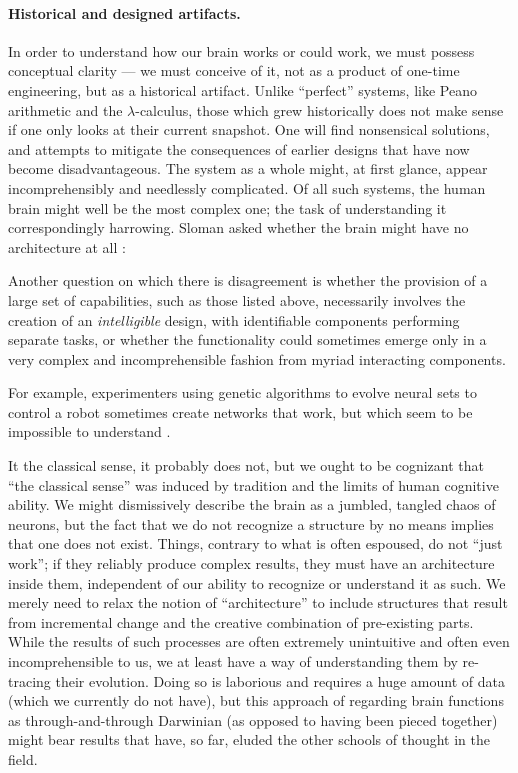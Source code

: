 \paragraph{Historical and designed artifacts.} In order to understand how our brain works or could work, we must possess conceptual clarity --- we must conceive of it, not as a product of one-time engineering, but as a historical artifact. Unlike ``perfect'' systems, like Peano arithmetic and the $\lambda$-calculus, those which grew historically does not make sense if one only looks at their current snapshot. One will find nonsensical solutions, and attempts to mitigate the consequences of earlier designs that have now become disadvantageous. The system as a whole might, at first glance, appear incomprehensibly and needlessly complicated. Of all such systems, the human brain might well be the most complex one; the task of understanding it correspondingly harrowing. Sloman asked whether the brain might have no architecture at all  \cite[p.\ 5]{sloman1997}:

\begin{emquote}
	Another question on which there is disagreement is whether the provision of a large set of capabilities, such as those listed above, necessarily involves the creation of an {\em intelligible} design, with identifiable components performing separate tasks, or whether the functionality could sometimes  emerge only in a very complex and incomprehensible fashion from myriad interacting components.
	
	For example, experimenters using genetic algorithms to evolve neural sets to control a robot sometimes create networks that work, but which seem to be impossible to understand .
\end{emquote}

It the classical sense, it probably does not, but we ought to be cognizant that ``the classical sense'' was induced by tradition and the limits of human cognitive ability. We might dismissively describe the brain as a jumbled, tangled chaos of neurons, but the fact that we do not recognize a structure by no means implies that one does not exist. Things, contrary to what is often espoused, do not ``just work''; if they reliably produce complex results, they must have an architecture inside them, independent of our ability to recognize or understand it as such. We merely need to relax the notion of ``architecture'' to include structures that result from incremental change and the creative combination of pre-existing parts. While the results of such processes are often extremely unintuitive and often even incomprehensible to us, we at least have a way of understanding them by re-tracing their evolution. Doing so is laborious and requires a huge amount of data (which we currently do not have), but this approach of regarding brain functions as through-and-through Darwinian (as opposed to having been pieced together) might bear results that have, so far, eluded the other schools of thought in the field.

